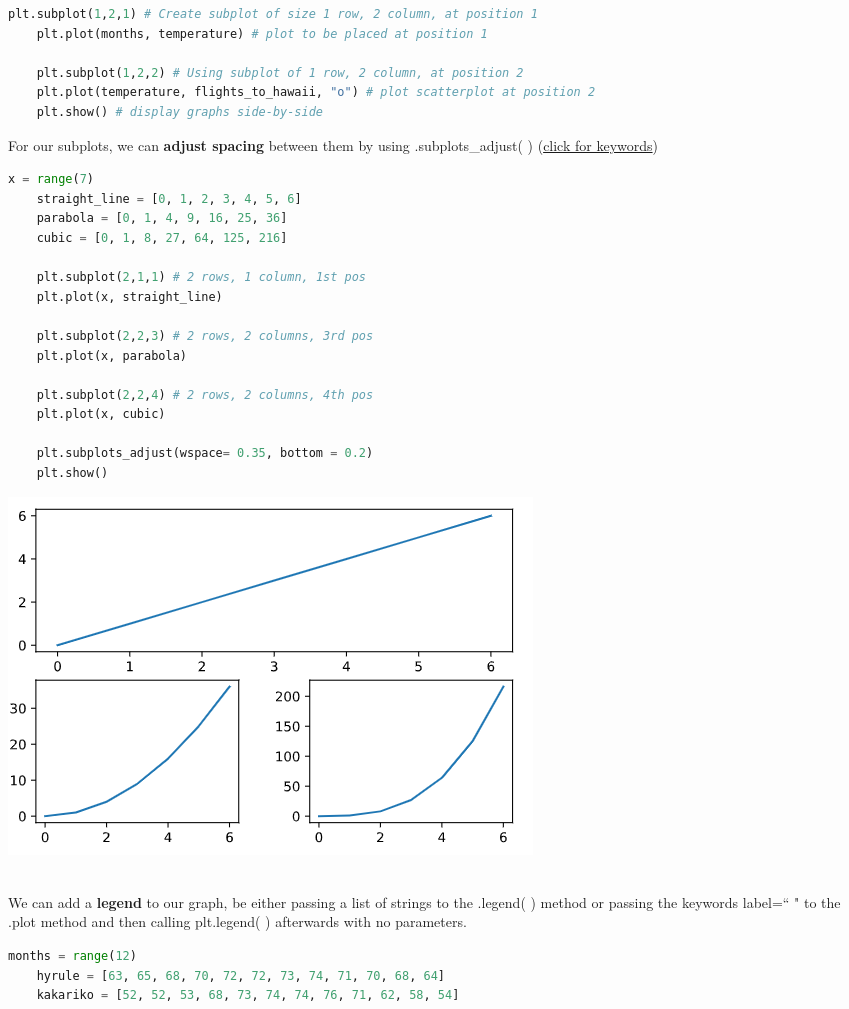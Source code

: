 \documentclass[11pt, a4paper]{article}
\begin{document}
\begin{spacing}{1.1}
\begin{lstlisting}[language=Python]
	plt.subplot(1,2,1) # Create subplot of size 1 row, 2 column, at position 1
	plt.plot(months, temperature) # plot to be placed at position 1
	
	plt.subplot(1,2,2) # Using subplot of 1 row, 2 column, at position 2
	plt.plot(temperature, flights_to_hawaii, "o") # plot scatterplot at position 2
	plt.show() # display graphs side-by-side \end{lstlisting} \newpage
	\noindent For our subplots, we can \textbf{adjust spacing} between them by using .subplots\_adjust( ) (\href{https://matplotlib.org/api/_as_gen/matplotlib.pyplot.subplots_adjust.html}{click for keywords})
	\begin{minipage}[c]{10cm}
	\begin{lstlisting}[language=Python]
	x = range(7)
	straight_line = [0, 1, 2, 3, 4, 5, 6]
	parabola = [0, 1, 4, 9, 16, 25, 36]
	cubic = [0, 1, 8, 27, 64, 125, 216]
		
	plt.subplot(2,1,1) # 2 rows, 1 column, 1st pos
	plt.plot(x, straight_line)
		
	plt.subplot(2,2,3) # 2 rows, 2 columns, 3rd pos
	plt.plot(x, parabola)
		
	plt.subplot(2,2,4) # 2 rows, 2 columns, 4th pos
	plt.plot(x, cubic)
		
	plt.subplots_adjust(wspace= 0.35, bottom = 0.2)
	plt.show() \end{lstlisting}\vspace*{1mm}
	\end{minipage}
	\begin{minipage}[c]{7cm}
		\includegraphics[scale=.55]{subadj}
	\end{minipage} \\
	We can add a \textbf{legend} to our graph, be either passing a list of strings to the .legend( ) method or passing the keywords label=`` " to the .plot method and then calling plt.legend( ) afterwards with no parameters.
	\begin{lstlisting}[language=Python]
	months = range(12)
	hyrule = [63, 65, 68, 70, 72, 72, 73, 74, 71, 70, 68, 64]
	kakariko = [52, 52, 53, 68, 73, 74, 74, 76, 71, 62, 58, 54]
	

\end{lstlisting}
\end{spacing}
\end{document}
